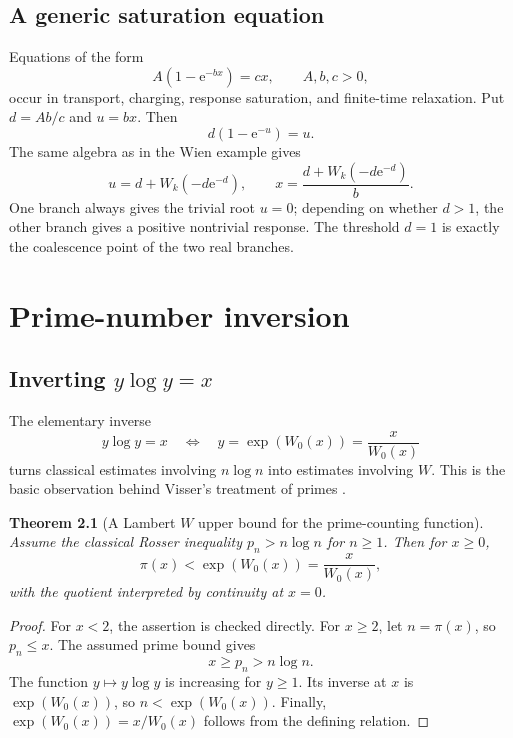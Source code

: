 \documentclass[11pt,openany]{book}
\newcommand{\e}{\mathrm{e}}
\theoremstyle{plain}
\newtheorem{theorem}{Theorem}[chapter]
\theoremstyle{definition}
\theoremstyle{remark}
\begin{document}
\section{A generic saturation equation}
Equations of the form
\begin{equation}\label{eq:saturation}
       A(1-\e^{-bx})=cx,
       \qquad A,b,c>0,
\end{equation}
occur in transport, charging, response saturation, and finite-time relaxation.
Put \(d=Ab/c\) and \(u=bx\).  Then
\[
       d(1-\e^{-u})=u.
\]
The same algebra as in the Wien example gives
\begin{equation}\label{eq:saturationsolution}
       u=d+W_k(-d\e^{-d}),
       \qquad
       x=\frac{d+W_k(-d\e^{-d})}{b}.
\end{equation}
One branch always gives the trivial root \(u=0\); depending on whether
\(d>1\), the other branch gives a positive nontrivial response.  The threshold
\(d=1\) is exactly the coalescence point of the two real branches.

\chapter{Prime-number inversion}\label{chap:primes}

\section{Inverting \texorpdfstring{\(y\log y=x\)}{y log y=x}}
The elementary inverse
\[
       y\log y=x
       \quad\Longleftrightarrow\quad
       y=\exp(W_0(x))=\frac{x}{W_0(x)}
\]
turns classical estimates involving \(n\log n\) into estimates involving
\(W\).  This is the basic observation behind Visser's treatment of primes
\cite{Visser2018}.

\begin{theorem}[A Lambert \(W\) upper bound for the prime-counting function]
Assume the classical Rosser inequality \(p_n>n\log n\) for \(n\ge1\).  Then
for \(x\ge0\),
\begin{equation}\label{eq:pibound}
       \pi(x)<\exp(W_0(x))=\frac{x}{W_0(x)},
\end{equation}
with the quotient interpreted by continuity at \(x=0\).
\end{theorem}

\begin{proof}
For \(x<2\), the assertion is checked directly.  For \(x\ge2\), let
\(n=\pi(x)\), so \(p_n\le x\).  The assumed prime bound gives
\[
       x\ge p_n>n\log n.
\]
The function \(y\mapsto y\log y\) is increasing for \(y\ge1\).  Its inverse
at \(x\) is \(\exp(W_0(x))\), so
\(n<\exp(W_0(x))\).  Finally,
\(\exp(W_0(x))=x/W_0(x)\) follows from the defining relation.
\end{proof}
\end{document}
